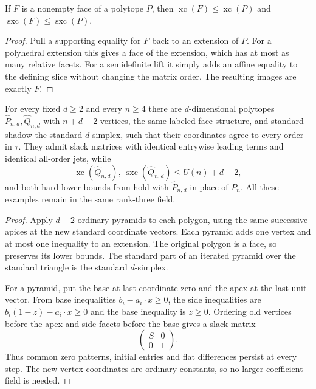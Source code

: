 \documentclass[11pt,a4paper]{article}
\numberwithin{equation}{section}
\theoremstyle{plain}
\newcommand{\xc}{\operatorname{xc}}
\newcommand{\sx}{\operatorname{sxc}}
\begin{document}
\begin{lemma}\label{poly:ic:lem:face}
If $F$ is a nonempty face of a polytope $P$, then
$\xc(F)\leq\xc(P)$ and $\sx(F)\leq\sx(P)$.
\end{lemma}
\begin{proof}
Pull a supporting equality for $F$ back to an extension of $P$. For a
polyhedral extension this gives a face of the extension, which has at
most as many relative facets. For a semidefinite lift it simply adds
an affine equality to the defining slice without changing the matrix
order. The resulting images are exactly $F$.
\end{proof}

\begin{corollary}\label{poly:ic:cor:higher}
For every fixed $d\geq2$ and every $n\geq4$ there are $d$-dimensional
polytopes $\widehat P_{n,d},\widehat Q_{n,d}$ with $n+d-2$ vertices,
the same labeled face structure, and standard shadow the standard
$d$-simplex, such that their coordinates agree to every order in $\tau$.
They admit slack matrices with identical entrywise leading terms and
identical all-order jets, while
\[
 \xc(\widehat Q_{n,d}),\ \sx(\widehat Q_{n,d})
       \leq U(n)+d-2,
\]
and both hard lower bounds from  hold with
$\widehat P_{n,d}$ in place of $P_n$. All these examples remain in the
same rank-three field.
\end{corollary}
\begin{proof}
Apply $d-2$ ordinary pyramids to each polygon, using the same successive
apices at the new standard coordinate vectors. Each pyramid adds one
vertex and at most one inequality to an extension. The original polygon
is a face, so  preserves its lower bounds. The standard
part of an iterated pyramid over the standard triangle is the standard
$d$-simplex.

For a pyramid, put the base at last coordinate zero and the apex at the
last unit vector. From base inequalities $b_i-a_i\cdot x\geq0$, the
side inequalities are $b_i(1-z)-a_i\cdot x\geq0$ and the base inequality
is $z\geq0$. Ordering old vertices before the apex and side facets
before the base gives a slack matrix
\[
 \begin{pmatrix}S&0\\0&1\end{pmatrix}.
\]
Thus common zero patterns, initial entries and flat differences persist
at every step. The new vertex coordinates are ordinary constants, so
no larger coefficient field is needed.
\end{proof}
\end{document}
